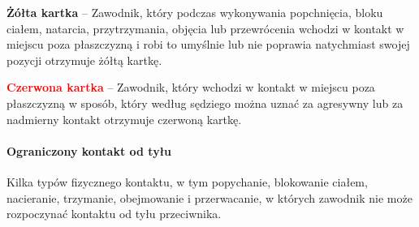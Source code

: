 \documentclass[12pt]{article}
\newcommand\redcard[1]{\bgroup\textcolor{red}{\textbf{#1}}}
\newcommand\yellowcard[1]{\bgroup\textcolor{darkyellow}{\textbf{#1}}}
\begin{document}
\yellowcard{Żółta kartka} -- Zawodnik, który podczas wykonywania popchnięcia,
bloku ciałem, natarcia, przytrzymania, objęcia lub przewrócenia wchodzi
w kontakt w miejscu poza płaszczyzną i robi to umyślnie lub nie poprawia
natychmiast swojej pozycji otrzymuje żółtą kartkę.

\redcard{Czerwona kartka} -- Zawodnik, który wchodzi w kontakt w miejscu
poza płaszczyzną w sposób, który według sędziego można uznać za
agresywny lub za nadmierny kontakt otrzymuje czerwoną kartkę.

\paragraph{Ograniczony kontakt od tyłu}

Kilka typów fizycznego kontaktu, w tym popychanie, blokowanie ciałem,
nacieranie, trzymanie, obejmowanie i przerwacanie, w których zawodnik
nie może rozpoczynać kontaktu od tyłu przeciwnika.
\end{document}
